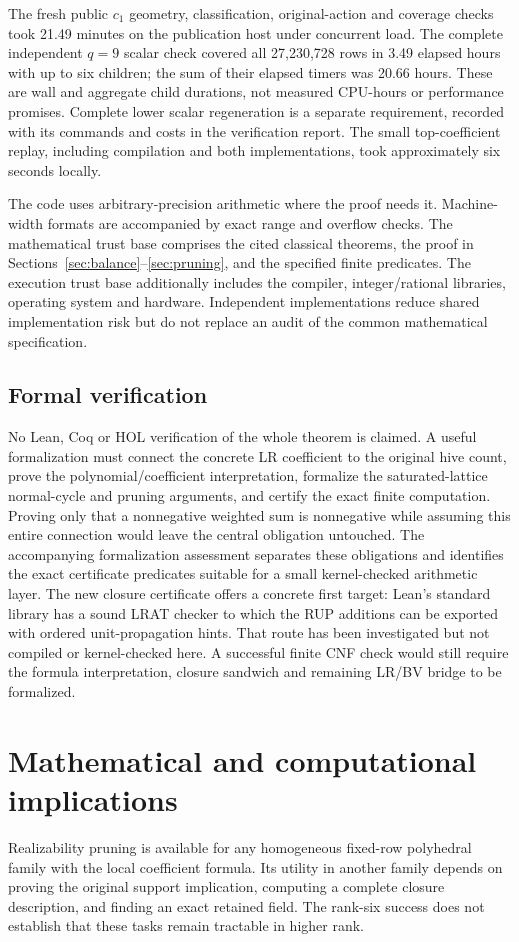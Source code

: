 \documentclass[11pt]{article}
\theoremstyle{definition}\newtheorem{definition}[theorem]{Definition}
\theoremstyle{remark}\newtheorem{remark}[theorem]{Remark}
\begin{document}
The fresh public \(c_1\) geometry, classification, original-action and coverage
checks took 21.49 minutes on the publication host under concurrent load.
The complete independent \(q=9\) scalar check covered all 27,230,728 rows in
3.49 elapsed hours with up to six children; the sum of their elapsed timers
was 20.66 hours. These are wall and aggregate child durations, not measured
CPU-hours or performance promises. Complete lower scalar regeneration is a
separate requirement, recorded with its commands and costs in the verification
report. The small top-coefficient replay, including compilation and both
implementations, took approximately six seconds locally.

The code uses arbitrary-precision arithmetic where the proof needs it.
Machine-width formats are accompanied by exact range and overflow checks.
The mathematical trust base comprises the cited classical theorems, the
proof in Sections~\ref{sec:balance}--\ref{sec:pruning}, and the specified
finite predicates. The execution trust base additionally includes the
compiler, integer/rational libraries, operating system and hardware.
Independent implementations reduce shared implementation risk but do not
replace an audit of the common mathematical specification.

\subsection{Formal verification}
No Lean, Coq or HOL verification of the whole theorem is claimed. A useful
formalization must connect the concrete LR coefficient to the original hive
count, prove the polynomial/coefficient interpretation, formalize the
saturated-lattice normal-cycle and pruning arguments, and certify the exact
finite computation. Proving only that a nonnegative weighted sum is
nonnegative while assuming this entire connection would leave the central
obligation untouched. The accompanying formalization assessment separates
these obligations and identifies the exact certificate predicates suitable
for a small kernel-checked arithmetic layer.
The new closure certificate offers a concrete first target: Lean's standard
library has a sound LRAT checker to which the RUP additions can be exported
with ordered unit-propagation hints. That route has been investigated but
not compiled or kernel-checked here. A successful finite CNF check would
still require the formula interpretation, closure sandwich and remaining
LR/BV bridge to be formalized.

\section{Mathematical and computational implications}
Realizability pruning is available for any homogeneous fixed-row polyhedral
family with the local coefficient formula. Its utility in another family
depends on proving the original support implication, computing a complete
closure description, and finding an exact retained field. The rank-six
success does not establish that these tasks remain tractable in higher rank.
\end{document}

